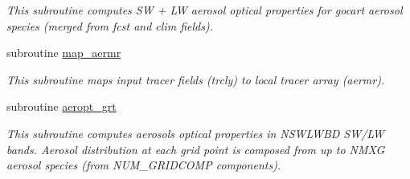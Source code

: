 \begin{DoxyCompactItemize}
\begin{DoxyCompactList}\small\item\em This subroutine computes SW + LW aerosol optical properties for gocart aerosol species (merged from fcst and clim fields). \end{DoxyCompactList}\item 
subroutine \hyperlink{group__module__radiation__aerosols_ga651c4be2fa354238990c5c7b9488e9fd}{map\+\_\+aermr}
\begin{DoxyCompactList}\small\item\em This subroutine maps input tracer fields (trcly) to local tracer array (aermr). \end{DoxyCompactList}\item 
subroutine \hyperlink{group__module__radiation__aerosols_ga4ff866c545425e7029a11999e97d8faa}{aeropt\+\_\+grt}
\begin{DoxyCompactList}\small\item\em This subroutine computes aerosols optical properties in N\+S\+W\+L\+W\+BD S\+W/\+LW bands. Aerosol distribution at each grid point is composed from up to N\+M\+XG aerosol species (from N\+U\+M\+\_\+\+G\+R\+I\+D\+C\+O\+MP components). \end{DoxyCompactList}\end{DoxyCompactItemize}

